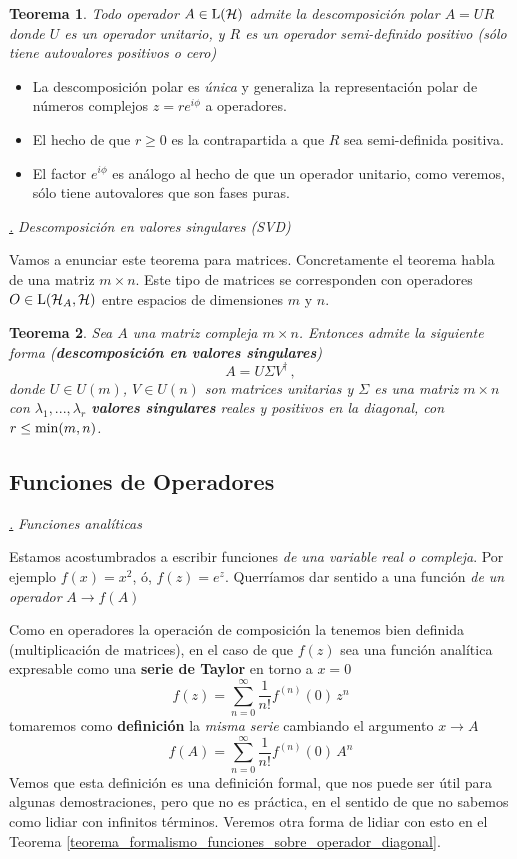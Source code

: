 \documentclass[a4paper,11pt]{book} %
\newtheorem{teorema_contador}{Teorema}
\newcommand{\Teorema}[1]{
		\begin{mybox_gray2}{}
			\begin{teorema_contador}
				 #1 
			\end{teorema_contador} 
		\end{mybox_gray2}
	}
\numberwithin{equation}{chapter}
\def\subsubiContadorIt{\par\addtocounter{subsubsection}{1}\underline{\it\thesubsubsection.}\hskip0.5cm \setcounter{subsubsubsectionIt}{0}}
\newcommand{\SubsubiIt}[1]{
		\subsubiContadorIt \textit{#1}
	}
\newcounter{subsubsubsectionIt}[subsubsection]
\begin{document}
	\Teorema{
	Todo operador $A\in{\rm L}(\mathcal{H})$ admite la descomposición polar $A = UR$ donde $U$ es un operador unitario, y $R$ es un operador semi-definido positivo (sólo tiene autovalores positivos o cero)
	}

\begin{itemize}
	\item La descomposición polar es \textit{única} y generaliza la representación polar de números complejos $z = r e^{i\phi}$ a operadores.
	\item El hecho de que $r\geq 0$ es la contrapartida a que $R$ sea semi-definida positiva. 
	\item El factor $e^{i\phi}$ es análogo al hecho de que un operador unitario, como veremos, sólo tiene autovalores que son fases puras.
\end{itemize}


			\SubsubiIt{Descomposición en valores singulares (SVD)}

Vamos a enunciar este teorema para matrices. Concretamente el teorema habla de una matriz $m\times n$. Este tipo de matrices se corresponden con operadores $O \in{\rm L}(\mathcal{H}_A,\mathcal{H})$ entre espacios de dimensiones $m$ y $n$.

	\Teorema{
	Sea $A$ una matriz compleja $m\times n$. Entonces  admite la siguiente forma (\textbf{descomposición en valores singulares})
	$$
	A = U\Sigma V^{\dagger} \, ,
	$$
	donde $U\in U(m)$, $V\in U(n)$ son matrices unitarias y $\Sigma$ es una matriz  $m\times n$ con $\lambda_1, ...,\lambda_r$ \textbf{valores singulares} reales y positivos en la diagonal, con $r\leq {\rm min}(m,n)$. 
	}



		\subsection{Funciones de Operadores}
		
			\SubsubiIt{Funciones analíticas}

Estamos acostumbrados a escribir funciones \textit{de una variable real o compleja}. Por ejemplo $f(x)= x^2$, ó, $ f(z) = e^z$. Querríamos dar sentido a una función \textit{de un operador} 
$
A \to f(A)
$


Como en operadores la operación de composición la tenemos bien definida (multiplicación de matrices), en el caso de que $f(z)$ sea una función analítica expresable como una \textbf{serie de Taylor} en torno a $x=0$ 
	\begin{equation}
	f(z) = \sum_{n=0}^\infty \frac{1}{n!} f^{(n)}(0)\,  z^n
	\end{equation}
tomaremos como \textbf{definición} la \textit{misma serie} cambiando el argumento $x\to A$
	\begin{equation}
	f(A) = \sum_{n=0}^\infty \frac{1}{n!} f^{(n)}(0)\,  A^n
	\end{equation}
Vemos que esta definición es una definición formal, que nos puede ser útil para algunas demostraciones, pero que no es práctica, en el sentido de que no sabemos como lidiar con infinitos términos. Veremos otra forma de lidiar con esto en el Teorema \ref{teorema_formalismo_funciones_sobre_operador_diagonal}.
\end{document}
